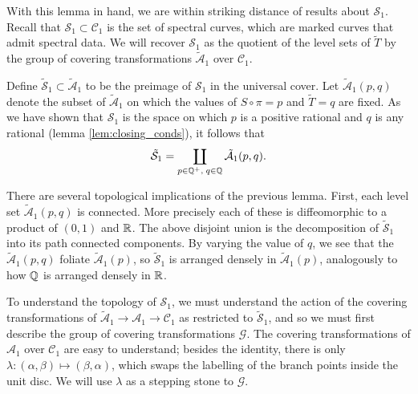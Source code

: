 With this lemma in hand, we are within striking distance of results about $\mathcal{S}_1$. Recall that $\mathcal{S}_1 \subset \mathcal{C}_1$ is the set of spectral curves, which are marked curves that admit spectral data. We will recover $\mathcal{S}_1$ as the quotient of the level sets of $\tilde{T}$ by the group of covering transformations $\mathcal{\tilde{A}}_1$ over $\mathcal{C}_1$.

Define $\mathcal{\tilde{S}}_1 \subset \mathcal{\tilde{A}}_1$ to be the preimage of $\mathcal{S}_1$ in the universal cover. Let $\mathcal{\tilde{A}}_1(p,q)$ denote the subset of $\mathcal{\tilde{A}}_1$ on which the values of $S\circ π = p$ and $\tilde{T} = q$ are fixed. As we have shown that $\mathcal{S}_1$ is the space on which $p$ is a positive rational and $q$ is any rational (lemma \ref{lem:closing_conds}), it follows that
\[
\mathcal{\tilde{S}}_1 = \coprod_{p\in \Q^+,\; q\in \Q} \mathcal{\tilde{A}}_1(p,q).
\]

There are several topological implications of the previous lemma. First, each level set $\mathcal{\tilde{A}}_1(p,q)$ is connected. More precisely each of these is diffeomorphic to a product of $(0,1)$ and $\R$. The above disjoint union is the decomposition of $\mathcal{\tilde{S}}_1$ into its path connected components. By varying the value of $q$, we see that the $\mathcal{\tilde{A}}_1(p,q)$ foliate $\mathcal{\tilde{A}}_1(p)$, so $\mathcal{\tilde{S}}_1$ is arranged densely in $\mathcal{\tilde{A}}_1(p)$, analogously to how $\Q$ is arranged densely in $\R$.

To understand the topology of $\mathcal{S}_1$, we must understand the action of the covering transformations of $\mathcal{\tilde{A}}_1 \to \mathcal{A}_1 \to \mathcal{C}_1$ as restricted to $\tilde{\mathcal{S}}_1$, and so we must first describe the group of covering transformations $\mathcal{G}$. The covering transformations of $\mathcal{A}_1$ over $\mathcal{C}_1$ are easy to understand; besides the identity, there is only $λ : (α,β) \mapsto (β,α)$, which swaps the labelling of the branch points inside the unit disc. We will use $λ$ as a stepping stone to $\mathcal{G}$.


